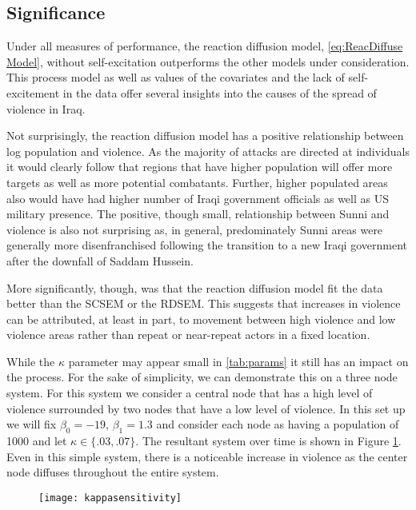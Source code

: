 \documentclass[11pt]{isuthesis}
\begin{document}
\subsection{Significance}

Under all measures of performance, the reaction diffusion model, \eqref{eq:ReacDiffuse Model}, without self-excitation outperforms the other models under consideration.  This process model as well as values of the covariates and the lack of self-excitement in the data offer several insights into the causes of the spread of violence in Iraq.

Not surprisingly, the reaction diffusion model has a positive relationship between log population and violence.  As the majority of attacks are directed at individuals it would clearly follow that regions that have higher population will offer more targets as well as more potential combatants.  Further, higher populated areas also would have had higher number of Iraqi government officials as well as US military presence.  The positive, though small, relationship between Sunni and violence is also not surprising as, in general, predominately Sunni areas were generally more disenfranchised following the transition to a new Iraqi government after the downfall of Saddam Hussein.

More significantly, though, was that the reaction diffusion model fit the data better than the SCSEM or the RDSEM.  This suggests that increases in violence can be attributed, at least in part, to movement between high violence and low violence areas rather than repeat or near-repeat actors in a fixed location.


While the $\kappa$ parameter may appear small in \ref{tab:params} it still has an impact on the process.  For the sake of simplicity, we can demonstrate this on a three node system.  For this system we consider a central node that has a high level of violence surrounded by two nodes that have a low level of violence. In this set up we will fix $\beta_0=-19$, $\beta_1=1.3$ and consider each node as having a population of 1000 and let $\kappa \in \{.03,.07\}$.  The resultant system over time is shown in Figure \ref{fig:kappa}.   Even in this simple system, there is a noticeable increase in violence as the center node diffuses throughout the entire system.  


\begin{figure}[h]
	\vspace*{.51cm}
	\centering
	\texttt{[image: kappasensitivity]}
	\label{fig:kappa}
\end{figure}
\end{document}
